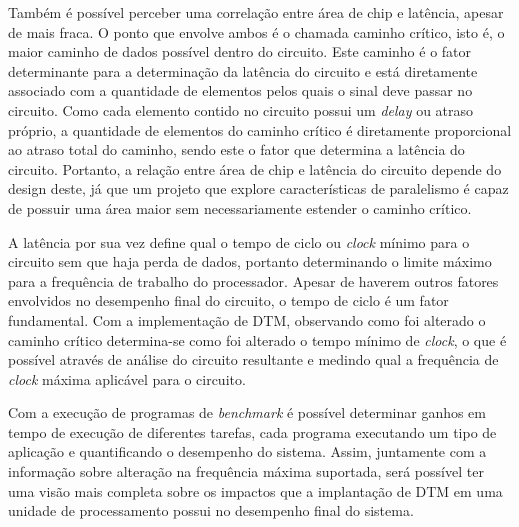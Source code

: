 Também é possível perceber uma correlação entre área de chip e latência, apesar de mais fraca. O ponto que envolve ambos é o chamada caminho crítico, isto é, o maior caminho de dados possível dentro do circuito. Este caminho é o fator determinante para a determinação da latência do circuito e está diretamente associado com a quantidade de elementos pelos quais o sinal deve passar no circuito. Como cada elemento contido no circuito possui um \textit{delay} ou atraso próprio, a quantidade de elementos do caminho crítico é diretamente proporcional ao atraso total do caminho, sendo este o fator que determina a latência do circuito. Portanto, a relação entre área de chip e latência do circuito depende do design deste, já que um projeto que explore características de paralelismo é capaz de possuir uma área maior sem necessariamente estender o caminho crítico.

A latência por sua vez define qual o tempo de ciclo ou \textit{clock} mínimo para o circuito sem que haja perda de dados, portanto determinando o limite máximo para a frequência de trabalho do processador. Apesar de haverem outros fatores envolvidos no desempenho final do circuito, o tempo de ciclo é um fator fundamental. Com a implementação de DTM, observando como foi alterado o caminho crítico determina-se como foi alterado o tempo mínimo de \textit{clock}, o que é possível através de análise do circuito resultante e medindo qual a frequência de \textit{clock} máxima aplicável para o circuito.

Com a execução de programas de \textit{benchmark} é possível determinar ganhos em tempo de execução de diferentes tarefas, cada programa executando um tipo de aplicação e quantificando o desempenho do sistema. Assim, juntamente com a informação sobre alteração na frequência máxima suportada, será possível ter uma visão mais completa sobre os impactos que a implantação de DTM em uma unidade de processamento possui no desempenho final do sistema.